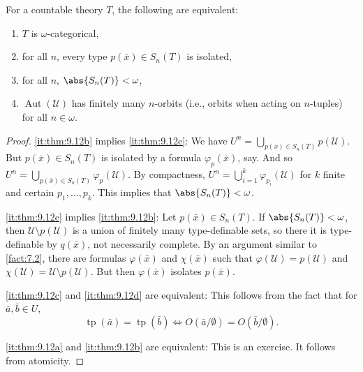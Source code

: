 \documentclass{article}
\DeclareMathOperator{\Aut}{Aut}
\DeclareMathOperator{\tp}{tp}
\newcommand{\U}{\mathcal{U}}
\begin{document}
\begin{nthm} \label{thm:9.12}
For a countable theory $T$, the following are equivalent:
\begin{enumerate}[label=(\roman*)]
\item $T$ is $\omega$-categorical, \label{it:thm:9.12a}
\item for all $n$, every type $p(\bar x) \in S_n(T)$ is isolated, \label{it:thm:9.12b}
\item for all $n$, $\abs{S_n(T)} < \omega$, \label{it:thm:9.12c}
\item $\Aut(\U)$ has finitely many $n$-orbits (i.e., orbits when acting on $n$-tuples) for all $n \in \omega$. \label{it:thm:9.12d}
\end{enumerate}
\end{nthm}
\begin{proof}
\ref{it:thm:9.12b} implies \ref{it:thm:9.12c}: We have $U^n = \bigcup_{p(\bar x) \in S_n(T)} p(\U)$. But $p(\bar x) \in S_n(T)$ is isolated by a formula $\varphi_p(\bar x)$, say. And so $U^n = \bigcup_{p(\bar x) \in S_n(T)} \varphi_p(\U)$. By compactness, $U^n = \bigcup_{i=1}^k \varphi_{p_i}(\U)$ for $k$ finite and certain $p_1, \dots, p_k$. This implies that $\abs{S_n(T)} < \omega$.

\ref{it:thm:9.12c} implies \ref{it:thm:9.12b}: Let $p(\bar x) \in S_n(T)$. If $\abs{S_n(T)} < \omega$, then $\U \setminus p(\U)$ is a union of finitely many type-definable sets, so there it is type-definable by $q(\bar x)$, not necessarily complete. By an argument similar to \cref{fact:7.2}, there are formulas $\varphi(\bar{x})$ and $\chi(\bar x)$ such that $\varphi(\U) = p(\U)$ and $\chi(\U) = \U \setminus p(\U)$. But then $\varphi(\bar{x})$ isolates $p(\bar x)$.

\ref{it:thm:9.12c} and \ref{it:thm:9.12d} are equivalent: This follows from the fact that for $\bar{a}, \bar{b} \in U$, 
\[
\tp(\bar{a}) = \tp(\bar{b}) \iff O(\bar{a}/\emptyset) = O(\bar{b}/\emptyset).
\]

\ref{it:thm:9.12a} and \ref{it:thm:9.12b} are equivalent: This is an exercise. It follows from atomicity.
\end{proof}

\clearpage
\end{document}
